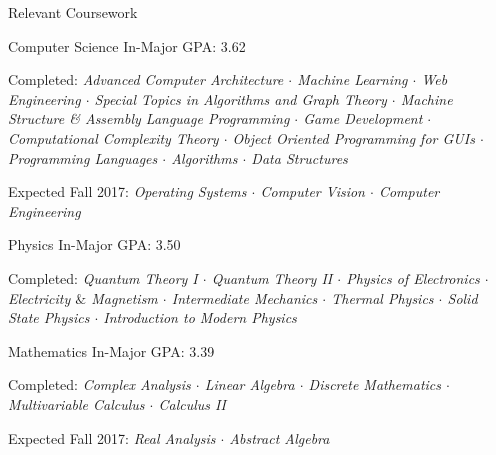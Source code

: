 \documentclass{resume}
\begin{document}
  \begin{rSection}{Relevant Coursework}
    \begin{rSubsection}{Computer Science}
        {In-Major GPA: 3.62}{}{}
        \item Completed: \textit{Advanced Computer Architecture $\cdot$ Machine Learning $\cdot$ Web Engineering $\cdot$ Special Topics in Algorithms and Graph Theory $\cdot$ Machine Structure \& Assembly Language Programming $\cdot$ Game Development $\cdot$ Computational Complexity Theory $\cdot$ Object Oriented Programming for GUIs $\cdot$ Programming Languages $\cdot$ Algorithms $\cdot$ Data Structures}
        \item Expected Fall 2017: \textit{Operating Systems $\cdot$ Computer Vision $\cdot$ Computer Engineering} 
    \end{rSubsection}
    \begin{rSubsection}{Physics}
        {In-Major GPA: 3.50}{}{}
        \item Completed: \textit{Quantum Theory I $\cdot$ Quantum Theory II $\cdot$ Physics of Electronics $\cdot$ Electricity $\&$ Magnetism $\cdot$ Intermediate Mechanics $\cdot$ Thermal Physics $\cdot$ Solid State Physics $\cdot$ Introduction to Modern Physics}
    \end{rSubsection}
    \begin{rSubsection}{Mathematics}
        {In-Major GPA: 3.39}{}{}
        \item Completed: \textit{Complex Analysis $\cdot$ Linear Algebra $\cdot$ Discrete Mathematics $\cdot$ Multivariable Calculus $\cdot$ Calculus II}
        \item Expected Fall 2017: \textit{Real Analysis $\cdot$ Abstract Algebra} 
    \end{rSubsection}
  \end{rSection}
\end{document}
